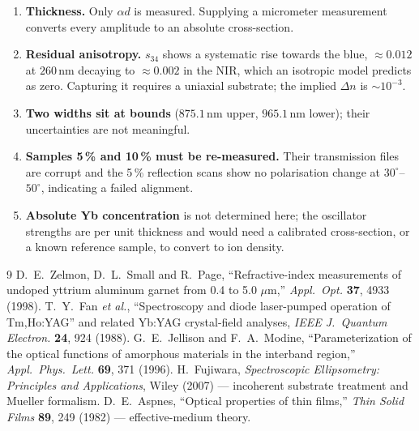 \documentclass[11pt,a4paper]{article}
\newcommand{\ad}{\alpha d}
\begin{document}
\begin{enumerate}
\item \textbf{Thickness.} Only $\ad$ is measured. Supplying a micrometer
      measurement converts every amplitude to an absolute cross-section.
\item \textbf{Residual anisotropy.} $s_{34}$ shows a systematic rise towards the
      blue, $\approx0.012$ at $260$\,nm decaying to $\approx0.002$ in the NIR,
      which an isotropic model predicts as zero. Capturing it requires a
      uniaxial substrate; the implied $\Delta n$ is $\sim10^{-3}$.
\item \textbf{Two widths sit at bounds} ($875.1$\,nm upper, $965.1$\,nm lower);
      their uncertainties are not meaningful.
\item \textbf{Samples 5\,\% and 10\,\% must be re-measured.} Their transmission
      files are corrupt and the 5\,\% reflection scans show no polarisation
      change at $30^\circ$--$50^\circ$, indicating a failed alignment.
\item \textbf{Absolute Yb concentration} is not determined here; the oscillator
      strengths are per unit thickness and would need a calibrated
      cross-section, or a known reference sample, to convert to ion density.
\end{enumerate}

\begin{thebibliography}{9}
 D.~E.~Zelmon, D.~L.~Small and R.~Page,
  ``Refractive-index measurements of undoped yttrium aluminum garnet from
  0.4 to 5.0 $\mu$m,'' \emph{Appl.\ Opt.} \textbf{37}, 4933 (1998).
 T.~Y.~Fan \emph{et al.},
  ``Spectroscopy and diode laser-pumped operation of Tm,Ho:YAG'' and related
  Yb:YAG crystal-field analyses, \emph{IEEE J.\ Quantum Electron.}
  \textbf{24}, 924 (1988).
 G.~E.~Jellison and F.~A.~Modine,
  ``Parameterization of the optical functions of amorphous materials in the
  interband region,'' \emph{Appl.\ Phys.\ Lett.} \textbf{69}, 371 (1996).
 H.~Fujiwara, \emph{Spectroscopic Ellipsometry: Principles and
  Applications}, Wiley (2007) --- incoherent substrate treatment and Mueller
  formalism.
 D.~E.~Aspnes, ``Optical properties of thin films,''
  \emph{Thin Solid Films} \textbf{89}, 249 (1982) --- effective-medium theory.
\end{thebibliography}
\end{document}
